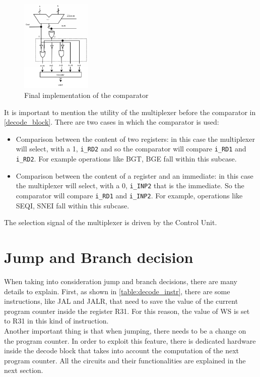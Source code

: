 \begin{figure}[H]
	\centering
	\includegraphics[width=0.3\textwidth]{chapters/4_DecodeStage/images/cmp_final.pdf}
	\caption{Final implementation of the comparator}
	\label{cmp_final}
\end{figure}

It is important to mention the utility of the multiplexer before the comparator in \autoref{decode_block}. There are two cases in which the comparator is used:

\begin{itemize}
  \item Comparison between the content of two registers: in this case the multiplexer will select, with a 1, \texttt{i\_RD2} and so the comparator will compare \texttt{i\_RD1} and \texttt{i\_RD2}. For example operations like BGT, BGE fall within this subcase. 
  \item Comparison between the content of a register and an immediate: in this case the multiplexer will select, with a 0, \texttt{i\_INP2} that is the immediate. So the comparator will compare \texttt{i\_RD1} and \texttt{i\_INP2}. For example, operations like SEQI, SNEI fall within this subcase. 
\end{itemize}

The selection signal of the multiplexer is driven by the Control Unit.

\section{Jump and Branch decision}
When taking into consideration jump and branch decisions, there are many details to explain. First, as shown in \autoref{table:decode_instr}, there are some instructions, like JAL and JALR, that need to save the value of the current program counter inside the register R31. For this reason, the value of WS is set to R31 in this kind of instruction. \\

Another important thing is that when jumping, there needs to be a change on the program counter. In order to exploit this feature, there is dedicated hardware inside the decode block that takes into account the computation of the next program counter. All the circuits and their functionalities are explained in the next section. \\

